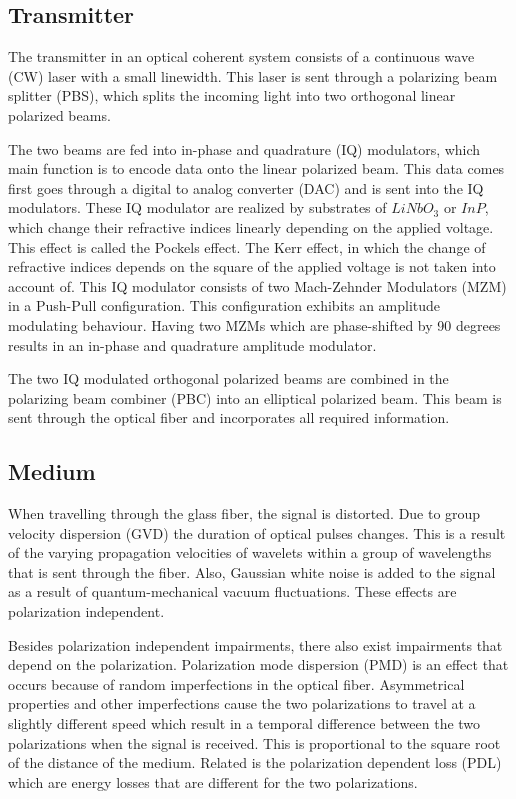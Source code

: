\documentclass[journal,10pt,twoside, a4paper]{IEEEtran}
\begin{document}
\subsection{Transmitter}
The transmitter in an optical coherent system consists of a continuous wave (CW) laser with a small linewidth. This laser is sent through a polarizing beam splitter (PBS), which splits the incoming light into two orthogonal linear polarized beams. 

The two beams are fed into in-phase and quadrature (IQ) modulators, which main function is to encode data onto the linear polarized beam. This data comes first goes through a digital to analog converter (DAC) and is sent into the IQ modulators. These IQ modulator are realized by substrates of $LiNbO_3$ or $InP$, which change their refractive indices linearly depending on the applied voltage. This effect is called the Pockels effect. The Kerr effect, in which the change of refractive indices depends on the square of the applied voltage is not taken into account of. This IQ modulator consists of two Mach-Zehnder Modulators (MZM) in a Push-Pull configuration. This configuration exhibits an amplitude modulating behaviour. Having two MZMs which are phase-shifted by 90 degrees results in an in-phase and quadrature amplitude modulator.

The two IQ modulated orthogonal polarized beams are combined in the polarizing beam combiner (PBC) into an elliptical polarized beam. This beam is sent through the optical fiber and incorporates all required information.

\subsection{Medium}\label{ch:Medium}
When travelling through the glass fiber, the signal is distorted. Due to group velocity dispersion (GVD) the duration of optical pulses changes. This is a result of the varying propagation velocities of wavelets within a group of wavelengths that is sent through the fiber. Also, Gaussian white noise is added to the signal as a result of quantum-mechanical vacuum fluctuations\cite{coherent_detection}. These effects are polarization independent. 

Besides polarization independent impairments, there also exist impairments that depend on the polarization. Polarization mode dispersion (PMD) is an effect that occurs because of random imperfections in the optical fiber. Asymmetrical properties and other imperfections cause the two polarizations to travel at a slightly different speed which result in a temporal difference between the two polarizations when the signal is received\cite{PMD}. This is proportional to the square root of the distance of the medium. Related is the polarization dependent loss (PDL) which are energy losses that are different for the two polarizations.
\end{document}
